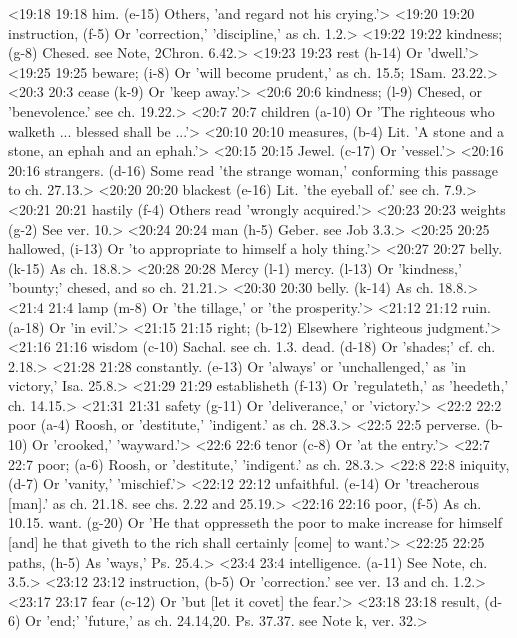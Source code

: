 <19:18 19:18  him. (e-15)  Others, 'and regard not his crying.'>
<19:20 19:20  instruction, (f-5)  Or 'correction,' 'discipline,' as ch. 1.2.>
<19:22 19:22  kindness; (g-8)  Chesed. see Note, 2Chron. 6.42.>
<19:23 19:23  rest (h-14)  Or 'dwell.'>
<19:25 19:25  beware; (i-8)  Or 'will become prudent,' as ch. 15.5; 1Sam. 23.22.>
<20:3 20:3  cease (k-9)  Or 'keep away.'>
<20:6 20:6  kindness; (l-9)  Chesed, or 'benevolence.' see ch. 19.22.>
<20:7 20:7  children (a-10)  Or 'The righteous who walketh ... blessed shall be ...'>
<20:10 20:10  measures, (b-4)  Lit. 'A stone and a stone, an ephah and an ephah.'>
<20:15 20:15  Jewel. (c-17)  Or 'vessel.'>
<20:16 20:16  strangers. (d-16)  Some read 'the strange woman,' conforming this passage to ch. 27.13.>
<20:20 20:20  blackest (e-16)  Lit. 'the eyeball of.' see ch. 7.9.>
<20:21 20:21  hastily (f-4)  Others read 'wrongly acquired.'>
<20:23 20:23  weights (g-2)  See ver. 10.>
<20:24 20:24  man (h-5)  Geber. see Job 3.3.>
<20:25 20:25  hallowed, (i-13)  Or 'to appropriate to himself a holy thing.'>
<20:27 20:27  belly. (k-15) As ch. 18.8.>
<20:28 20:28  Mercy (l-1)  mercy. (l-13)
  Or 'kindness,' 'bounty;' chesed, and so ch. 21.21.>
<20:30 20:30  belly. (k-14)  As ch. 18.8.>
<21:4 21:4  lamp (m-8)  Or 'the tillage,' or 'the prosperity.'>
<21:12 21:12  ruin. (a-18)  Or 'in evil.'>
<21:15 21:15  right; (b-12)  Elsewhere 'righteous judgment.'>
<21:16 21:16  wisdom (c-10)  Sachal. see ch. 1.3.
  dead. (d-18)  Or 'shades;' cf. ch. 2.18.>
<21:28 21:28  constantly. (e-13)  Or 'always' or 'unchallenged,' as 'in victory,' Isa. 25.8.>
<21:29 21:29  establisheth (f-13)  Or 'regulateth,' as 'heedeth,' ch. 14.15.>
<21:31 21:31  safety (g-11)  Or 'deliverance,' or 'victory.'>
<22:2 22:2  poor (a-4)  Roosh, or 'destitute,' 'indigent.' as ch. 28.3.>
<22:5 22:5  perverse. (b-10)  Or 'crooked,' 'wayward.'>
<22:6 22:6  tenor (c-8)  Or 'at the entry.'>
<22:7 22:7  poor; (a-6)  Roosh, or 'destitute,' 'indigent.' as ch. 28.3.>
<22:8 22:8  iniquity, (d-7)  Or 'vanity,' 'mischief.'>
<22:12 22:12  unfaithful. (e-14)  Or 'treacherous [man].' as ch. 21.18. see chs. 2.22 and 25.19.>
<22:16 22:16  poor, (f-5)  As ch. 10.15.
  want. (g-20)  Or 'He that oppresseth the poor to make increase for himself  [and] he that giveth to the rich shall certainly [come] to  want.'>
<22:25 22:25  paths, (h-5)  As 'ways,' Ps. 25.4.>
<23:4 23:4  intelligence. (a-11)  See Note, ch. 3.5.>
<23:12 23:12  instruction, (b-5)  Or 'correction.' see ver. 13 and ch. 1.2.>
<23:17 23:17  fear (c-12)  Or 'but [let it covet] the fear.'>
<23:18 23:18  result, (d-6)  Or 'end;' 'future,' as ch. 24.14,20. Ps. 37.37. see Note k,  ver. 32.>
